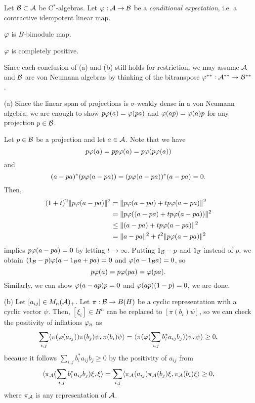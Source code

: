 \documentclass{../../small}
\begin{document}
\begin{thm}[Tomiyama]
Let $\mathcal{B}\subset\mathcal{A}$ be C$^*$-algebras.
Let $\varphi:\mathcal{A}\to\mathcal{B}$ be a \emph{conditional expectation}, i.e. a contractive idempotent linear map.
\begin{parts}
\item $\varphi$ is $B$-bimodule map.
\item $\varphi$ is completely positive.
\end{parts}
\end{thm}
\begin{pf}
Since each conclusion of (a) and (b) still holds for restriction, we may assume $\mathcal{A}$ and $\mathcal{B}$ are von Neumann algebras by thinking of the bitranspose $\varphi^{**}:\mathcal{A}^{**}\to\mathcal{B}^{**}$.

(a)
Since the linear span of projections is $\sigma$-weakly dense in a von Neumann algebra, we are enough to show $p\varphi(a)=\varphi(pa)$ and $\varphi(ap)=\varphi(a)p$ for any projection $p\in\mathcal{B}$.

Let $p\in\mathcal{B}$ be a projection and let $a\in\mathcal{A}$.
Note that we have
\[p\varphi(a)=pp\varphi(a)=p\varphi(p\varphi(a))\]
and
\[(a-pa)^*(p\varphi(a-pa))=(p\varphi(a-pa))^*(a-pa)=0.\]
Then,
\begin{align*}
(1+t)^2\|p\varphi(a-pa)\|^2
&=\|p\varphi(a-pa)+tp\varphi(a-pa)\|^2\\
&=\|p\varphi((a-pa)+tp\varphi(a-pa))\|^2\\
&\le\|(a-pa)+tp\varphi(a-pa)\|^2\\
&=\|a-pa\|^2+t^2\|p\varphi(a-pa)\|^2
\end{align*}
implies $p\varphi(a-pa)=0$ by letting $t\to\infty$.
Putting $1_{\mathcal{B}}-p$ and $1_{\mathcal{B}}$ instead of $p$, we obtain $(1_{\mathcal{B}}-p)\varphi(a-1_{\mathcal{B}} a+pa)=0$ and $\varphi(a-1_{\mathcal{B}} a)=0$, so
\[p\varphi(a)=p\varphi(pa)=\varphi(pa).\]
Similarly, we can show $\varphi(a-ap)p=0$ and $\varphi(ap)(1-p)=0$, we are done.

(b)
Let $[a_{ij}]\in M_n(\mathcal{A})_+$.
Let $\pi:\mathcal{B}\to B(H)$ be a cyclic representation with a cyclic vector $\psi$.
Then, $[\xi_i]\in H^n$ can be replaced to $[\pi(b_i)\psi]$, so we can check the positivity of inflations $\varphi_n$ as
\[\sum_{i,j}\langle\pi(\varphi(a_{ij}))\pi(b_j)\psi,\pi(b_i)\psi\rangle=\langle\pi(\varphi(\sum_{i,j}b_i^*a_{ij}b_j))\psi,\psi\rangle\ge0,\]
because it follows $\sum_{i,j}b_i^*a_{ij}b_j\ge0$ by the positivity of $a_{ij}$ from
\[\langle\pi_{\mathcal{A}}(\sum_{i,j}b_i^*a_{ij}b_j)\xi,\xi\rangle=\sum_{i,j}\langle\pi_{\mathcal{A}}(a_{ij})\pi_{\mathcal{A}}(b_j)\xi,\pi_{\mathcal{A}}(b_i)\xi\rangle\ge0,\]
where $\pi_{\mathcal{A}}$ is any representation of $\mathcal{A}$.
\end{pf}
\end{document}
